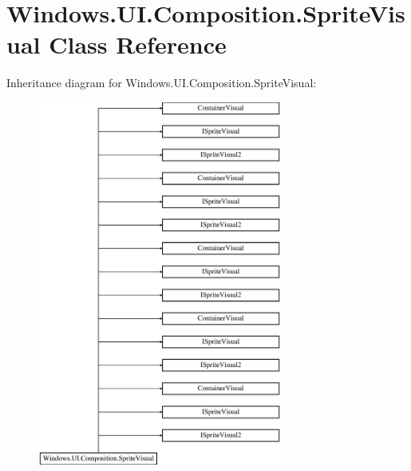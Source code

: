 \hypertarget{class_windows_1_1_u_i_1_1_composition_1_1_sprite_visual}{}\section{Windows.\+U\+I.\+Composition.\+Sprite\+Visual Class Reference}
\label{class_windows_1_1_u_i_1_1_composition_1_1_sprite_visual}
Inheritance diagram for Windows.\+U\+I.\+Composition.\+Sprite\+Visual\+:\begin{figure}[H]
\begin{center}
\leavevmode
\includegraphics[height=12.000000cm]{class_windows_1_1_u_i_1_1_composition_1_1_sprite_visual}
\end{center}
\end{figure}
